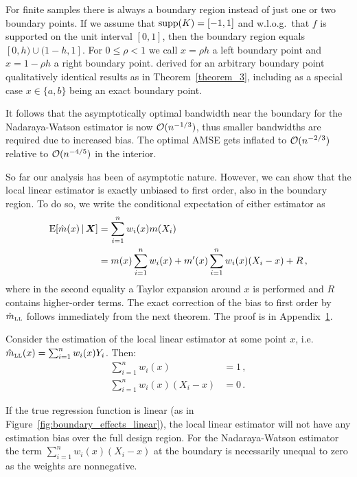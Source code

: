 For finite samples there is always a boundary region instead of just one or two boundary points.
If we assume that $\operatorname{supp}(K) = [-1, 1]$ and w.l.o.g.\ that $f$ is supported on the unit interval $[0, 1]$,
then the boundary region equals $[0, h) \cup (1-h, 1]$.
For $0 \leq \rho < 1$ we call $x = \rho h$ a left boundary point and $x = 1 - \rho h$ a right boundary point.
\textcite[Theorem~3.2]{Fan_1996} derived for an arbitrary boundary point qualitatively identical results as in Theorem~\ref{theorem_3},
including as a special case $x \in \{a, b\}$ being an exact boundary point.

It follows that the asymptotically optimal bandwidth near the boundary for the Nadaraya-Watson estimator is now $\operatorname{\mathcal{O}}(n^{-1/3})$,
thus smaller bandwidths are required due to increased bias.
The optimal AMSE gets inflated to $\operatorname{\mathcal{O}}(n^{-2/3})$ relative to $\operatorname{\mathcal{O}}(n^{-4/5})$ in the interior.

So far our analysis has been of asymptotic nature.
However, we can show that the local linear estimator is exactly unbiased to first order, also in the boundary region.
To do so, we write the conditional expectation of either estimator as
\begin{align}
	\operatorname{E} [\hat{m}(x) \,|\, \bm{X}] &= \sum_{i = 1}^{n} w_i(x) m(X_i) \\
	&= m(x) \sum_{i = 1}^{n} w_i(x) + m'(x) \sum_{i = 1}^{n} w_i(x) (X_i - x) + R \,,
\end{align}
where in the second equality a Taylor expansion around $x$ is performed and $R$ contains higher-order terms.
The exact correction of the bias to first order by $\hat{m}_{\textup{\tiny LL}}$ follows immediately from the next theorem.
The proof is in Appendix~\hyperref[appendix_1]{1}. 
\begin{samepage}
	\begin{theorem} \label{theorem_4}
		Consider the estimation of the local linear estimator at some point $x$, i.e.\ $\hat{m}_{\textup{\tiny LL}}(x) = \sum_{i = 1}^{n} w_i(x) Y_i$.
		Then:
		\begin{align}
			\sum_{i = 1}^{n} w_i(x) &= 1 \,, \\
			\sum_{i = 1}^{n} w_i(x) (X_i - x) &= 0 \,.
		\end{align}
	\end{theorem}
\end{samepage}
If the true regression function is linear (as in Figure~\ref{fig:boundary_effects_linear}),
the local linear estimator will not have any estimation bias over the full design region.
For the Nadaraya-Watson estimator the term $\sum_{i = 1}^{n} w_i(x) (X_i - x)$ at the boundary is necessarily unequal to zero as the weights are nonnegative.

